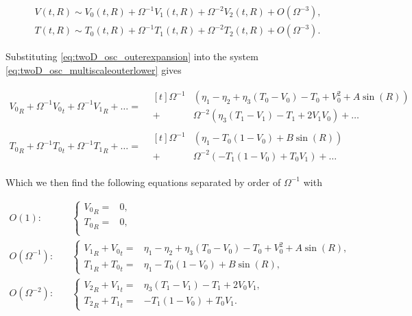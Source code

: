 \begin{equation}\label{eq:twoD_osc_outerexpansion}
\begin{aligned}
V(t,R)\sim V_0(t,R) +\Omega^{-1}V_1(t,R) +\Omega^{-2}V_2(t,R)+O(\Omega^{-3}),\\
T(t,R)\sim T_0(t,R) +\Omega^{-1}T_1(t,R) +\Omega^{-2}T_2(t,R)+O(\Omega^{-3}).
\end{aligned}
\end{equation}

Substituting \eqref{eq:twoD_osc_outerexpansion} into the system \eqref{eq:twoD_osc_multiscaleouterlower} gives

\begin{equation*}
\begin{aligned}
{V_0}_R+\Omega^{-1}{V_0}_t+\Omega^{-1}{V_1}_R+\ldots=&\begin{aligned}[t]\Omega^{-1}&(\eta_1-\eta_2+\eta_3(T_0-V_0)-T_0+V_0^2+A\sin(R))\\
+&\Omega^{-2}(\eta_3(T_1-V_1)-T_1+2V_1V_0)+\ldots
\end{aligned}\\
{T_0}_R+\Omega^{-1}{T_0}_t+\Omega^{-1}{T_1}_R+\ldots=&\begin{aligned}[t]  \Omega^{-1}&(\eta_1-T_0(1-V_0)+B\sin(R))\\
+&\Omega^{-2}(-T_1(1-V_0)+T_0V_1)+\ldots
\end{aligned}
\end{aligned}
\end{equation*}

Which we then find the following equations separated by order of $\Omega^{-1}$ with

\begin{align}
\label{eq:twoD_osc_outerO1}
O(1):\quad & \begin{cases}
	{V_0}_R =&  0, \\
	{T_0}_R =&  0,\\
\end{cases}\\
\label{eq:twoD_osc_outerO2}
O(\Omega^{-1}):\quad & \begin{cases}
	{V_1}_R+{V_0}_t = & \eta_1-\eta_2+\eta_3(T_0-V_0)-T_0+V_0^2+A\sin(R),\\
	 {T_1}_R +{T_0}_t =&  \eta_1-T_0(1-V_0)+B\sin(R),
\end{cases}\\
\label{eq:twoD_osc_outerO3}
O(\Omega^{-2}):\quad & \begin{cases}
	{V_2}_R+{V_1}_t = & \eta_3(T_1-V_1)-T_1+2V_0V_1,\\
	 {T_2}_R +{T_1}_t =&  -T_1(1-V_0)+T_0V_1.
\end{cases}
\end{align}

